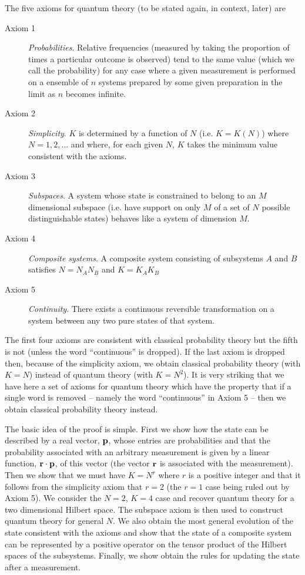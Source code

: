 \documentclass[10pt,twocolumn]{article}
\begin{document}
The five
axioms for quantum theory (to be stated again, in context, later) are
\begin{description}
\item[Axiom 1] {\it Probabilities}.  Relative frequencies (measured by
taking the proportion of times a particular outcome is observed)
tend to the same value (which we call the probability) for any case
where a given measurement is performed on a ensemble of $n$ systems
prepared by some given preparation in the limit as $n$ becomes infinite.
\item[Axiom 2] {\it Simplicity}. $K$ is determined by a function of
$N$ (i.e. $K=K(N)$) where $N=1,2,\dots$ and where, for each
given $N$, $K$ takes the minimum value consistent with the axioms.
\item[Axiom 3] {\it Subspaces}. A system whose state is constrained to
belong to an $M$
dimensional subspace (i.e. have support on only $M$ of a set of $N$ possible
distinguishable states) behaves like a system of dimension $M$.
\item[Axiom 4]  {\it Composite systems}. A composite system consisting of
subsystems $A$ and $B$ satisfies $N=N_AN_B$ and $K=K_AK_B$
\item[Axiom 5] {\it Continuity}. There exists a continuous reversible
transformation on a system between any two pure states of that
system.
\end{description}
The first four axioms are consistent with classical probability theory
but the fifth is not (unless the word ``continuous'' is dropped).
If the last axiom is dropped then, because of the
simplicity axiom, we obtain
classical probability theory (with $K=N$) instead of quantum theory
(with $K=N^2$).
It is very striking that we have here a set of axioms for quantum theory
which have the property that if a
single word is removed -- namely the word ``continuous'' in Axiom 5 --
then we obtain classical probability theory instead.



The basic idea of the proof is simple.  First we show how the state can
be described by a real vector, ${\bf p}$, whose entries are
probabilities and that the
probability associated with an arbitrary measurement is given by a linear
function, ${\bf r}\cdot {\bf p}$, of this vector (the vector ${\bf r}$
is associated with the measurement).  Then we show that we must have $K=N^r$
where $r$ is
a positive integer and that it follows from the simplicity axiom that
$r=2$ (the $r=1$ case being ruled out by Axiom 5). We consider the
$N=2$, $K=4$ case and recover quantum
theory for a two dimensional Hilbert space. The subspace axiom is then
used to construct quantum theory for general $N$.  We also obtain the
most general evolution of the state consistent with the axioms and show
that the state of a composite system can be represented by a positive
operator on the tensor product of the Hilbert spaces of the subsystems.
Finally, we show obtain the rules for updating the state after a
measurement.
\end{document}
